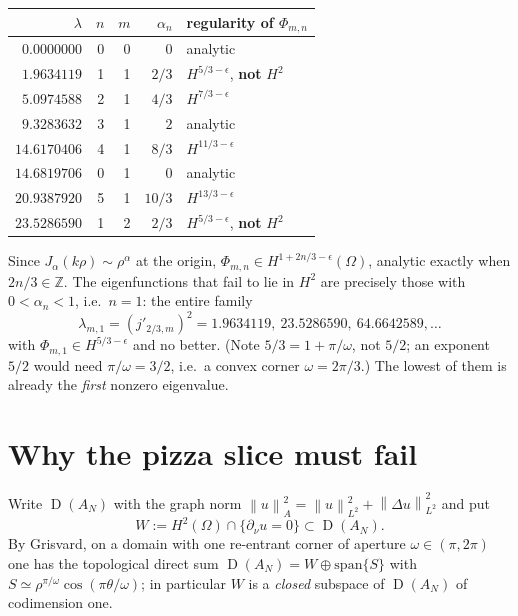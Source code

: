 \documentclass[11pt,a4paper]{article}
\newcommand{\norm}[1]{\left\|#1\right\|}
\DeclareMathOperator{\dom}{D}
\begin{document}
\begin{center}
\begin{tabular}{rrrrl}
\hline
$\lambda$ & $n$ & $m$ & $\alpha_n$ & regularity of $\Phi_{m,n}$ \\
\hline
 $0.0000000$ & 0 & 0 & $0$   & analytic \\
 $1.9634119$ & 1 & 1 & $2/3$ & $H^{5/3-\epsilon}$, \textbf{not} $H^2$ \\
 $5.0974588$ & 2 & 1 & $4/3$ & $H^{7/3-\epsilon}$ \\
 $9.3283632$ & 3 & 1 & $2$   & analytic \\
$14.6170406$ & 4 & 1 & $8/3$ & $H^{11/3-\epsilon}$ \\
$14.6819706$ & 0 & 1 & $0$   & analytic \\
$20.9387920$ & 5 & 1 & $10/3$& $H^{13/3-\epsilon}$ \\
$23.5286590$ & 1 & 2 & $2/3$ & $H^{5/3-\epsilon}$, \textbf{not} $H^2$ \\
\hline
\end{tabular}
\end{center}

Since $J_{\alpha}(k\rho)\sim\rho^{\alpha}$ at the origin,
$\Phi_{m,n} \in H^{1+2n/3-\epsilon}(\Omega)$, analytic exactly when $2n/3 \in \mathbb{Z}$.
The eigenfunctions that fail to lie in $H^2$ are precisely those with
$0 < \alpha_n < 1$, i.e.\ $n = 1$: the entire family
\begin{equation}
  \lambda_{m,1} = (j'_{2/3,m})^2 = 1.9634119,\ 23.5286590,\ 64.6642589,\dots
\end{equation}
with $\Phi_{m,1} \in H^{5/3-\epsilon}$ and no better. (Note $5/3 = 1 + \pi/\omega$,
not $5/2$; an exponent $5/2$ would need $\pi/\omega = 3/2$, i.e.\ a convex
corner $\omega = 2\pi/3$.) The lowest of them is already the \emph{first}
nonzero eigenvalue.

\section{Why the pizza slice must fail}

Write $\dom(A_N)$ with the graph norm
$\norm{u}_{A}^2 = \norm{u}^2_{L^2}+\norm{\Delta u}^2_{L^2}$ and put
\begin{equation}
  W := H^2(\Omega) \cap \{\partial_\nu u = 0\} \subset \dom(A_N).
\end{equation}
By Grisvard, on a domain with one re-entrant corner of aperture
$\omega \in (\pi,2\pi)$ one has the topological direct sum
$\dom(A_N) = W \oplus \mathrm{span}\{S\}$ with
$S \simeq \rho^{\pi/\omega}\cos(\pi\theta/\omega)$; in particular $W$ is a
\emph{closed} subspace of $\dom(A_N)$ of codimension one.
\end{document}
